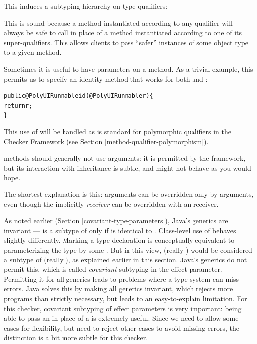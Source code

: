 This induces a subtyping hierarchy on type qualifiers:

\centerline{ \precsym{}  \precsym{} }

\noindent
This is sound because a method instantiated according to any qualifier will always be
safe to call in place of a method instantiated according to one of its super-qualifiers.
This allows clients to pass ``safer'' instances of some object type to a given method.



Sometimes it is useful to have  parameters on a method.  As a trivial example, this
permits us to specify an identity method that works for both  and
:

\begin{alltt}
public @PolyUI Runnable id(@PolyUI Runnable r) \{
    return r;
\}
\end{alltt}

\noindent
This use of  will be handled as is standard for polymorphic qualifiers in the Checker
Framework (see Section \ref{method-qualifier-polymorphism}).

 methods should generally not use  arguments: it is permitted by
the framework, but its interaction with inheritance is subtle, and might not behave as you would
hope.

The shortest explanation is this:  arguments can be overridden only by 
arguments, even though the implicitly  \emph{receiver} can be overridden with an
 receiver.

As noted earlier (Section \ref{covariant-type-parameters}), Java's generics are invariant ---
 is a subtype of  only if  is identical to .
Class-level use of  behaves slightly differently.
Marking a type declaration  is conceptually
equivalent to parameterizing the type by some .  But in this view,
 (really ) would be considered a subtype of
 (really ), as explained earlier in this section.  Java's
generics do not permit this, which is called \emph{covariant} subtyping in the effect parameter.
Permitting it for all generics leads to problems where a type system can miss errors.  Java solves
this by making all generics invariant, which rejects more programs than strictly necessary, but
leads to an easy-to-explain limitation.  For this checker, covariant subtyping of effect parameters
is very important: being able to pass an  in place of a  is extremely useful.  Since we need to allow some
cases for flexibility, but need to reject other cases to avoid missing errors, the distinction is a
bit more subtle for this checker.

